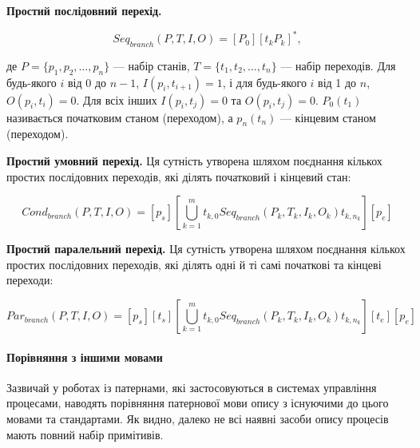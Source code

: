 \documentclass{memoir}
\begin{document}
\textbf{Простий послідовний перехід.}

$$
 Seq_{branch}(P, T, I, O) = [P_0][t_k P_k]^*,
$$

де \( P = \{ p_1, p_2, \ldots, p_n \} \) — набір станів, \( T = \{ t_1, t_2, \ldots, t_n \} \) — набір переходів. Для будь-якого \( i \) від 0 до \( n-1 \), \( I(p_i, t_{i+1}) = 1 \), і для будь-якого \( i \) від 1 до \( n \), \( O(p_i, t_i) = 0 \). Для всіх інших \( I(p_i, t_j) = 0 \) та \( O(p_i, t_j) = 0 \). \( P_0(t_1) \) називається початковим станом (переходом), а \( p_n(t_n) \) — кінцевим станом (переходом).

\textbf{Простий умовний перехід.} Ця сутність утворена шляхом поєднання кількох простих послідовних переходів, які ділять початковий і кінцевий стан:

\[
Cond_{branch}(P, T, I, O) = [p_s]\left[ \bigcup_{k=1}^{m} t_{k,0} Seq_{branch}(P_k, T_k, I_k, O_k) t_{k,n_k} \right][p_e]
\]

\textbf{Простий паралельний перехід.} Ця сутність утворена шляхом поєднання кількох простих послідовних переходів, які ділять одні й ті самі початкові та кінцеві переходи:

\[
Par_{branch}(P, T, I, O) = [p_s][t_s]\left[ \bigcup_{k=1}^{m} t_{k,0} Seq_{branch}(P_k, T_k, I_k, O_k) t_{k,n_k} \right][t_e][p_e]
\]

\paragraph{Порівняння з іншими мовами}

Зазвичай у роботах із патернами, які застосовуються в системах управління процесами, наводять порівняння патернової мови опису з існуючими до цього мовами та стандартами. Як видно, далеко не всі наявні засоби опису процесів мають повний набір примітивів.
\end{document}
